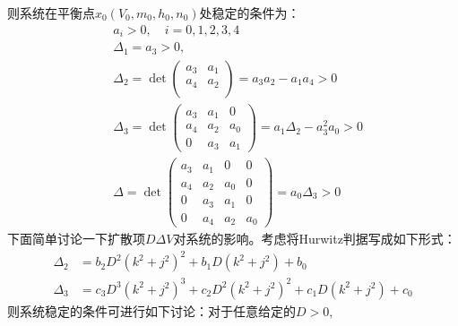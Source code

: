 \documentclass[
    bachelor,
    nofont, %
    pdflinks,
    ]{xjtuthesis}
\begin{document}
则系统在平衡点$x_0(V_{0},m_{0},h_{0},n_{0})$处稳定的条件为：
\begin{align*}
&a_i>0, \quad i=0,1,2,3,4 \\
& \Delta_1= a_3>0,\\
& \Delta_2 = \det
\left(
\begin{array}{cc}
a_3 & a_1 \\
a_4 & a_2 \\
\end{array}
\right) =a_3a_2-a_1a_4>0 \\
& \Delta_3 = \det
\left(
\begin{array}{cccc}a_3 & a_1 & 0 \\
a_4 & a_2 & a_0 \\
0 & a_3 & a_1  
\end{array}
\right)=a_1 \Delta_2-a_3^2a_0>0\\
&\Delta = \det
\left(
\begin{array}{cccc}
a_3 & a_1 & 0 & 0\\
a_4 & a_2 & a_0 & 0\\
0 & a_3 & a_1 & 0\\
0 & a_4 & a_2 & a_0 
\end{array}
\right) =a_0\Delta_3>0
\end{align*}
下面简单讨论一下扩散项$D\Delta V$对系统的影响。考虑将Hurwitz判据写成如下形式：
\begin{align}
\Delta_2 &=b_2D^2(k^2+j^2)^2+b_1D(k^2+j^2)+b_0\\
\Delta_3 &=c_3D^3(k^2+j^2)^3+c_2D^2(k^2+j^2)^2+c_1D(k^2+j^2)+c_0
\end{align}
则系统稳定的条件可进行如下讨论：对于任意给定的$D>0$,
\end{document}
